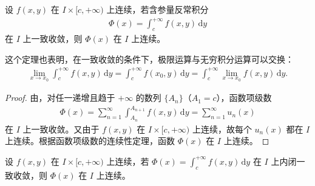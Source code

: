 \documentclass[../../main.tex]{subfiles}
\begin{document}
\begin{theorem}[连续性]\label{theorem:含参量反常积分的连续性定理}
设 \( f(x,y) \) 在 \( I \times [c, +\infty) \) 上连续，若含参量反常积分
\begin{align}\label{12}
\Phi(x) = \int_{c}^{+\infty} f(x,y) \, \mathrm{d}y
\end{align}
在 \( I \) 上一致收敛，则 \( \Phi(x) \) 在 \( I \) 上连续。
\end{theorem}
\begin{note}
这个定理也表明，在一致收敛的条件下，极限运算与无穷积分运算可以交换：
\begin{align}\label{eq::::--34802jrw4f3454t}
\lim_{x \to x_0} \int_{c}^{+\infty} f(x,y) \, \mathrm{d}y = \int_{c}^{+\infty} f(x_0,y) \, \mathrm{d}y = \int_{c}^{+\infty} \lim_{x \to x_0} f(x,y) \, \mathrm{d}y.
\end{align}
\end{note}
\begin{proof}
由，对任一递增且趋于 \( +\infty \) 的数列 \( \{A_n\} \)（\( A_1 = c \)），函数项级数
\begin{align}\label{eq::::--34802jrw4f34t}
\Phi(x) = \sum_{n=1}^{\infty} \int_{A_n}^{A_{n+1}} f(x,y) \, \mathrm{d}y = \sum_{n=1}^{\infty} u_n(x)
\end{align}
在 \( I \) 上一致收敛。又由于 \( f(x,y) \) 在 \( I \times [c, +\infty) \) 上连续，故每个 \( u_n(x) \) 都在 \( I \) 上连续。根据函数项级数的连续性定理，函数 \( \Phi(x) \) 在 \( I \) 上连续。

\end{proof}

\begin{corollary}
设 \( f(x,y) \) 在 \( I \times [c, +\infty) \) 上连续，若 \( \Phi(x) = \int_{c}^{+\infty} f(x,y) \, \mathrm{d}y \) 在 \( I \) 上内闭一致收敛，则 \( \Phi(x) \) 在 \( I \) 上连续。
\end{corollary}
\end{document}
